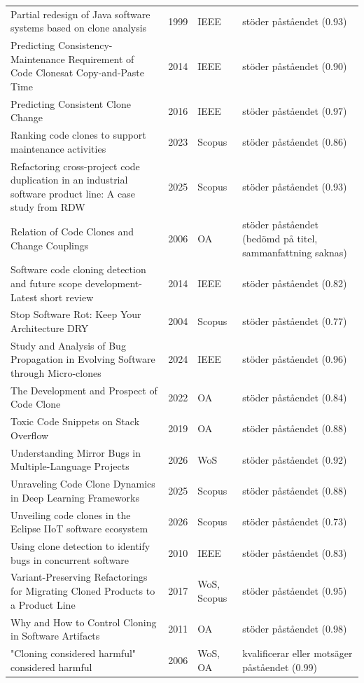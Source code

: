 \begin{longtable}{@{}%
  >{\raggedright\arraybackslash}p{}c%
  >{\raggedright\arraybackslash}p{}%
  >{\raggedright\arraybackslash}p{}@{}}
Partial redesign of Java software systems based on clone analysis & 1999 & IEEE & stöder påståendet (0.93) \\
Predicting Consistency-Maintenance Requirement of Code Clonesat Copy-and-Paste Time & 2014 & IEEE & stöder påståendet (0.90) \\
Predicting Consistent Clone Change & 2016 & IEEE & stöder påståendet (0.97) \\
Ranking code clones to support maintenance activities & 2023 & Scopus & stöder påståendet (0.86) \\
Refactoring cross-project code duplication in an industrial software product line: A case study from RDW & 2025 & Scopus & stöder påståendet (0.93) \\
Relation of Code Clones and Change Couplings & 2006 & OA & stöder påståendet (bedömd på titel, sammanfattning saknas) \\
Software code cloning detection and future scope development- Latest short review & 2014 & IEEE & stöder påståendet (0.82) \\
Stop Software Rot: Keep Your Architecture DRY & 2004 & Scopus & stöder påståendet (0.77) \\
Study and Analysis of Bug Propagation in Evolving Software through Micro-clones & 2024 & IEEE & stöder påståendet (0.96) \\
The Development and Prospect of Code Clone & 2022 & OA & stöder påståendet (0.84) \\
Toxic Code Snippets on Stack Overflow & 2019 & OA & stöder påståendet (0.88) \\
Understanding Mirror Bugs in Multiple-Language Projects & 2026 & WoS & stöder påståendet (0.92) \\
Unraveling Code Clone Dynamics in Deep Learning Frameworks & 2025 & Scopus & stöder påståendet (0.88) \\
Unveiling code clones in the Eclipse IIoT software ecosystem & 2026 & Scopus & stöder påståendet (0.73) \\
Using clone detection to identify bugs in concurrent software & 2010 & IEEE & stöder påståendet (0.83) \\
Variant-Preserving Refactorings for Migrating Cloned Products to a Product Line & 2017 & WoS, Scopus & stöder påståendet (0.95) \\
Why and How to Control Cloning in Software Artifacts & 2011 & OA & stöder påståendet (0.98) \\
"Cloning considered harmful" considered harmful & 2006 & WoS, OA & kvalificerar eller motsäger påståendet (0.99) \\

\end{longtable}
